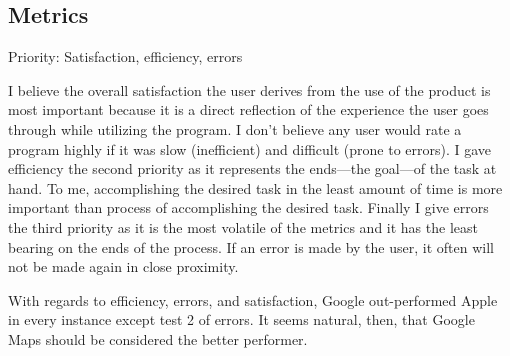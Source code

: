 \documentclass[12pt, oneside]{article}
\begin{document}
\subsection{Metrics}

Priority: Satisfaction, efficiency, errors

I believe the overall satisfaction the user derives from the use of the product is most important because it is a direct reflection of the experience the user goes through while utilizing the program. I don’t believe any user would rate a program highly if it was slow (inefficient) and difficult (prone to errors). I gave efficiency the second priority as it represents the ends—the goal—of the task at hand. To me, accomplishing the desired task in the least amount of time is more important than process of accomplishing the desired task. Finally I give errors the third priority as it is the most volatile of the metrics and it has the least bearing on the ends of the process. If an error is made by the user, it often will not be made again in close proximity.

With regards to efficiency, errors, and satisfaction, Google out-performed Apple in every instance except test 2 of errors. It seems natural, then, that Google Maps should be considered the better performer.
\end{document}
